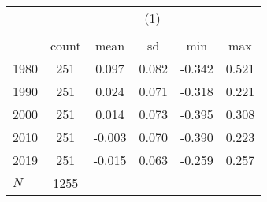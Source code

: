 {
\def\sym#1{\ifmmode^{#1}\else\(^{#1}\)\fi}
\begin{tabular}{l*{1}{ccccc}}
\toprule
            &\multicolumn{5}{c}{(1)}                                         \\
            &\multicolumn{5}{c}{}                                            \\
            &       count&        mean&          sd&         min&         max\\
\midrule
1980        &         251&       0.097&       0.082&      -0.342&       0.521\\
1990        &         251&       0.024&       0.071&      -0.318&       0.221\\
2000        &         251&       0.014&       0.073&      -0.395&       0.308\\
2010        &         251&      -0.003&       0.070&      -0.390&       0.223\\
2019        &         251&      -0.015&       0.063&      -0.259&       0.257\\
\midrule
\(N\)       &        1255&            &            &            &            \\
\bottomrule
\end{tabular}
}
